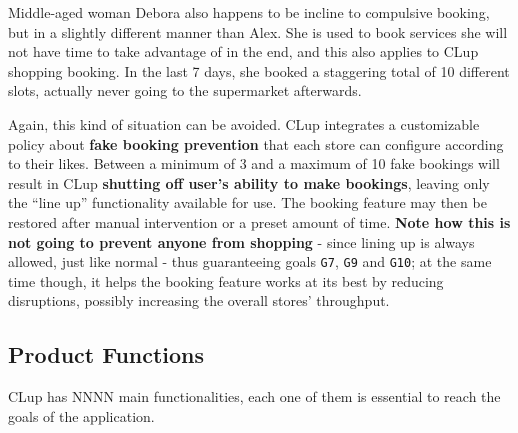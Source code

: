 Middle-aged woman Debora also happens to be incline to \guillemotleft compulsive booking\guillemotright, but in a slightly different manner than Alex. \newline
She is used to book services she will not have time to take advantage of in the end, and this also applies to CLup shopping booking. In the last 7 days, she booked a staggering total of 10 different slots, actually never going to the supermarket afterwards.

Again, this kind of situation can be avoided. CLup integrates a customizable policy about \textbf{fake booking prevention} that each store can configure according to their likes. \newline
Between a minimum of 3 and a maximum of 10 fake bookings will result in CLup \textbf{shutting off user's ability to make bookings}, leaving only the ``line up'' functionality available for use. The booking feature may then be restored after manual intervention or a preset amount of time. \newline
\textbf{Note how this is not going to prevent anyone from shopping} - since lining up is always allowed, just like normal - thus guaranteeing goals \texttt{G7}, \texttt{G9} and \texttt{G10}; at the same time though, it helps the booking feature works at its best by reducing disruptions, possibly increasing the overall stores' throughput.

\subsection{Product Functions}
CLup has NNNN main functionalities, each one of them is essential to reach the goals of the application.\\

